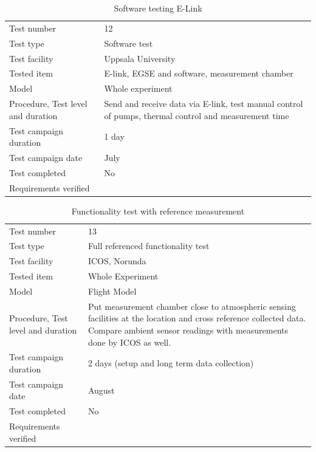 \documentclass[
  a4paper,
  11pt,
  openany,
  parskip,
  toc=totoc,
  listof=totoc,
  bibliography=totoc
]{scrreprt}
\begin{document}
\begin{table}[H]
\centering
\caption{Software testing E-Link}
\label{tab:test6}
\begin{tabular}{L{5cm}L{10cm}}
\toprule
Test number & 12 \\
Test type & Software test \\
Test facility & Uppsala University \\
Tested item & E-link, EGSE and software, measurement chamber \\
Model & Whole experiment \\
Procedure, Test level and duration & Send and receive data via E-link, test manual control of pumps, thermal control and measurement time \\
Test campaign duration & 1 day \\
Test campaign date & July \\
Test completed & No \\
Requirements verified & \\
\bottomrule
\end{tabular}
\end{table}


\begin{table}[H]
\centering
\caption{Functionality test with reference measurement}
\label{tab:test13}
\begin{tabular}{L{5cm}L{10cm}}
\toprule
Test number & 13 \\
Test type & Full referenced functionality test \\
Test facility & ICOS, Norunda \\
Tested item & Whole Experiment \\
Model & Flight Model \\
Procedure, Test level and duration & Put measurement chamber close to atmospheric sensing facilities at the location and cross reference collected data. Compare ambient sensor readings with measurements done by ICOS as well. \\
Test campaign duration & 2 days (setup and long term data collection) \\
Test campaign date & August \\
Test completed & No \\
Requirements verified & \\
\bottomrule
\end{tabular}
\end{table}
\end{document}

